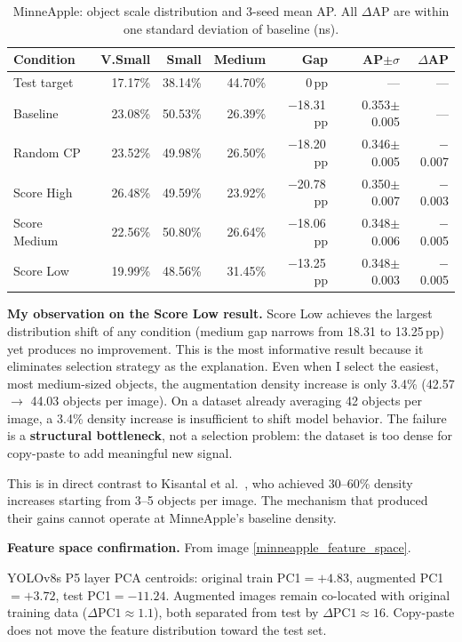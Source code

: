 \documentclass[10pt, a4paper]{article}
\begin{document}
\begin{table}[H]
\centering\small
\caption{MinneApple: object scale distribution and 3-seed mean AP.
  All $\Delta$AP are within one standard deviation of baseline (ns).}
\begin{tabular}{lrrrrrr}
\toprule
\textbf{Condition} & \textbf{V.Small} & \textbf{Small}
  & \textbf{Medium} & \textbf{Gap} & \textbf{AP$\pm\sigma$}
  & $\Delta$\textbf{AP} \\
\midrule
Test target
  & 17.17\% & 38.14\% & 44.70\% & 0\,pp & --- & --- \\
\midrule
Baseline
  & 23.08\% & 50.53\% & 26.39\% & $-$18.31\,pp
  & 0.353$\pm$0.005 & --- \\
Random CP
  & 23.52\% & 49.98\% & 26.50\% & $-$18.20\,pp
  & 0.346$\pm$0.005 & $-$0.007 \\
Score High
  & 26.48\% & 49.59\% & 23.92\% & $-$20.78\,pp
  & 0.350$\pm$0.007 & $-$0.003 \\
Score Medium
  & 22.56\% & 50.80\% & 26.64\% & $-$18.06\,pp
  & 0.348$\pm$0.006 & $-$0.005 \\
Score Low
  & 19.99\% & 48.56\% & 31.45\% & $-$13.25\,pp
  & 0.348$\pm$0.003 & $-$0.005 \\
\bottomrule
\end{tabular}
\end{table}

\textbf{My observation on the Score Low result.}
Score Low achieves the largest distribution shift of any condition
(medium gap narrows from 18.31 to 13.25\,pp) yet produces no improvement.
This is the most informative result because it eliminates selection
strategy as the explanation.
Even when I select the easiest, most medium-sized objects,
the augmentation density increase is only 3.4\%
(42.57 $\to$ 44.03 objects per image).
On a dataset already averaging 42 objects per image,
a 3.4\% density increase is insufficient to shift model behavior.
The failure is a \textbf{structural bottleneck}, not a selection problem:
the dataset is too dense for copy-paste to add meaningful new signal.

This is in direct contrast to Kisantal et al.\ \cite{kisantal2019},
who achieved 30--60\% density increases starting from 3--5 objects
per image.
The mechanism that produced their gains cannot operate at MinneApple's
baseline density.

\textbf{Feature space confirmation.}
From image \ref{minneapple_feature_space}.

YOLOv8s P5 layer PCA centroids:
original train PC1$=+4.83$, augmented PC1$=+3.72$,
test PC1$=-11.24$.
Augmented images remain co-located with original training data
($\Delta\text{PC1}\approx 1.1$), both separated from test by
$\Delta\text{PC1}\approx 16$.
Copy-paste does not move the feature distribution toward the test set.
\end{document}
